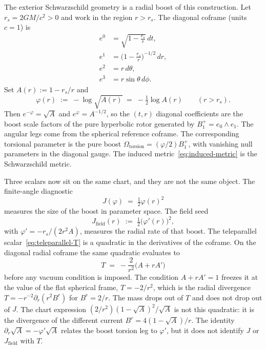 \documentclass[a4paper]{article}
\begin{document}
The exterior Schwarzschild geometry is a radial boost of this construction. Let \(r_{s}=2GM/c^{2}>0\) and work in the region \(r>r_{s}\). The diagonal coframe (units \(c=1\)) is
\begin{align}
e^{0} &= \sqrt{1-\frac{r_{s}}{r}}\,dt,\nonumber\\
e^{1} &= \bigl(1-\frac{r_{s}}{r}\bigr)^{-1/2}\,dr,\nonumber\\
e^{2} &= r\,d\theta,\nonumber\\
e^{3} &= r\sin\theta\,d\phi.
\label{eq:schwarzschild-tetrad}
\end{align}
Set \(A(r):=1-r_{s}/r\) and
\begin{equation}
\varphi(r) \;:=\; -\log\sqrt{A(r)} \;=\; -\tfrac12\log A(r)
\qquad(r>r_{s}).
\label{eq:radial-rapidity}
\end{equation}
Then \(e^{-\varphi}=\sqrt{A}\) and \(e^{\varphi}=A^{-1/2}\), so the \((t,r)\) diagonal coefficients are the boost scale factors of the pure hyperbolic rotor generated by \(B^{+}_{1}=e_{0}\wedge e_{1}\). The angular legs come from the spherical reference coframe. The corresponding torsional parameter is the pure boost \(\Omega_{\mathrm{torsion}}=(\varphi/2)B^{+}_{1}\), with vanishing null parameters in the diagonal gauge. The induced metric~\eqref{eq:induced-metric} is the Schwarzschild metric.

Three scalars now sit on the same chart, and they are not the same object. The finite-angle diagnostic
\[
J(\varphi) \;=\; \tfrac12\varphi(r)^{2}
\]
measures the size of the boost in parameter space. The field seed
\begin{equation}
J_{\mathrm{field}}(r) \;:=\; \tfrac12\bigl(\varphi'(r)\bigr)^{2},
\label{eq:J-field}
\end{equation}
with \(\varphi'=-r_{s}/(2r^{2}A)\), measures the radial rate of that boost. The teleparallel scalar~\eqref{eq:teleparallel-T} is a quadratic in the derivatives of the coframe. On the diagonal radial coframe the same quadratic evaluates to
\[
T \;=\; -\frac{2}{r^{2}}\bigl(A+r A'\bigr)
\]
before any vacuum condition is imposed. The condition \(A+r A'=1\) freezes it at the value of the flat spherical frame, \(T=-2/r^{2}\), which is the radial divergence \(T=-r^{-2}\partial_{r}(r^{2}B^{r})\) for \(B^{r}=2/r\). The mass drops out of \(T\) and does not drop out of \(J\). The chart expression \((2/r^{2})(1-\sqrt{A})^{2}/\sqrt{A}\) is not this quadratic: it is the divergence of the different current \(B^{r}=4(1-\sqrt{A})/r\). The identity \(\partial_{r}\sqrt{A}=-\varphi'\sqrt{A}\) relates the boost torsion leg to \(\varphi'\), but it does not identify \(J\) or \(J_{\mathrm{field}}\) with \(T\).
\end{document}
